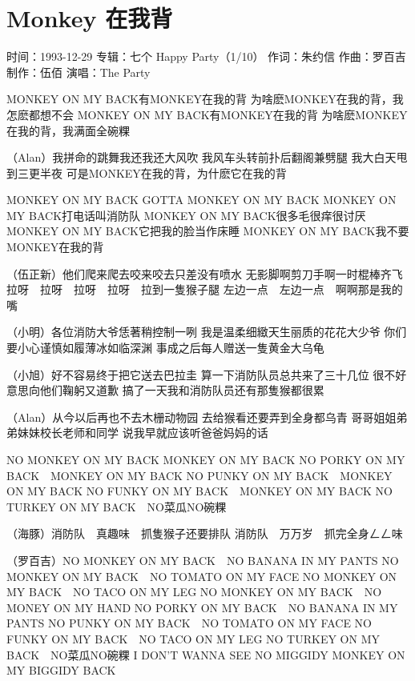 \documentclass[UTF8,a4paper,oneside,twocolumn,12pt]{ctexbook}
\newcommand{\infopair}[2]{\textbullet #1：#2}
\newcommand{\zc}[1][伍佰]{\infopair{作词}{#1}}
\newcommand{\zq}[1][伍佰]{\infopair{作曲}{#1}}
\newcommand{\zj}[1]{\infopair{专辑}{#1}}
\newcommand{\zz}[1]{\infopair{制作}{#1}}
\newcommand{\sj}[1]{\infopair{时间}{#1}}
\newenvironment{info}{\begin{flushleft}\kaishu
	}
	{\end{flushleft}\normalsize\yahei\par}
\newenvironment{lyric}{
	}
{}
\begin{document}
\section{Monkey 在我背}
\begin{info}
	\sj{1993-12-29}
	\zj{七个 Happy Party（1/10）}
	\zc[朱约信]
	\zq[罗百吉]
	\zz{伍佰}
	\infopair{演唱}{The Party}
\end{info}
\begin{lyric}
	MONKEY ON MY BACK有MONKEY在我的背
	为啥麽MONKEY在我的背，我怎麽都想不会
	MONKEY ON MY BACK有MONKEY在我的背
	为啥麽MONKEY在我的背，我满面全碗粿

	（Alan）我拼命的跳舞我还我还大风吹
	我风车头转前扑后翻阁兼劈腿
	我大白天甩到三更半夜
	可是MONKEY在我的背，为什麽它在我的背

	MONKEY ON MY BACK GOTTA MONKEY ON MY BACK
	MONKEY ON MY BACK打电话叫消防队
	MONKEY ON MY BACK很多毛很痒很讨厌
	MONKEY ON MY BACK它把我的脸当作床睡
	MONKEY ON MY BACK我不要MONKEY在我的背

	（伍正新）他们爬来爬去咬来咬去只差没有喷水
	无影脚啊剪刀手啊一时棍棒齐飞
	拉呀　拉呀　拉呀　拉呀　拉到一隻猴子腿
	左边一点　左边一点　啊啊那是我的嘴

	（小明）各位消防大爷恁著稍控制一咧
	我是温柔细緻天生丽质的花花大少爷
	你们要小心谨慎如履薄冰如临深渊
	事成之后每人赠送一隻黄金大乌龟

	（小旭）好不容易终于把它送去巴拉圭
	算一下消防队员总共来了三十几位
	很不好意思向他们鞠躬又道歉
	搞了一天我和消防队员还有那隻猴都很累

	（Alan）从今以后再也不去木栅动物园
	去给猴看还要弄到全身都乌青
	哥哥姐姐弟弟妹妹校长老师和同学
	说我早就应该听爸爸妈妈的话

	NO MONKEY ON MY BACK MONKEY ON MY BACK
	NO PORKY ON MY BACK　MONKEY ON MY BACK
	NO PUNKY ON MY BACK　MONKEY ON MY BACK
	NO FUNKY ON MY BACK　MONKEY ON MY BACK
	NO TURKEY ON MY BACK　NO菜瓜NO碗粿

	（海豚）消防队　真趣味　抓隻猴子还要排队
	消防队　万万岁　抓完全身ㄥㄥ味

	（罗百吉）NO MONKEY ON MY BACK　NO BANANA IN MY PANTS
	NO MONKEY ON MY BACK　NO TOMATO ON MY FACE
	NO MONKEY ON MY BACK　NO TACO ON MY LEG
	NO MONKEY ON MY BACK　NO MONEY ON MY HAND
	NO PORKY ON MY BACK　NO BANANA IN MY PANTS
	NO PUNKY ON MY BACK　NO TOMATO ON MY FACE
	NO FUNKY ON MY BACK　NO TACO ON MY LEG
	NO TURKEY ON MY BACK　NO菜瓜NO碗粿
	I DON'T WANNA SEE NO MIGGIDY MONKEY ON MY BIGGIDY BACK
\end{lyric}
\end{document}
